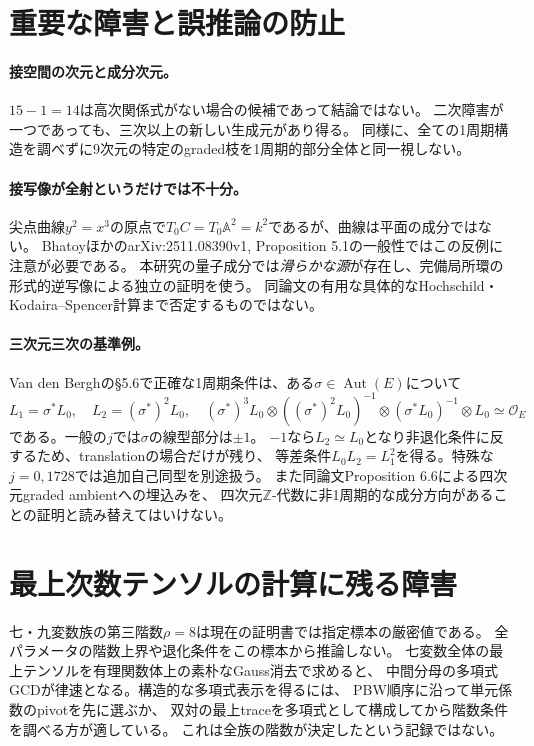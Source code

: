 \documentclass[11pt,a4paper]{ltjsarticle}
\begin{document}
\section{重要な障害と誤推論の防止}
\paragraph{接空間の次元と成分次元。}
$15-1=14$は高次関係式がない場合の候補であって結論ではない。
二次障害が一つであっても、三次以上の新しい生成元があり得る。
同様に、全ての1周期構造を調べずに9次元の特定のgraded枝を1周期的部分全体と同一視しない。

\paragraph{接写像が全射というだけでは不十分。}
尖点曲線$y^2=x^3$の原点で$T_0C=T_0\mathbb A^2=k^2$であるが、曲線は平面の成分ではない。
BhatoyほかのarXiv:2511.08390v1, Proposition 5.1の一般性ではこの反例に注意が必要である。
本研究の量子成分では\emph{滑らかな源}が存在し、完備局所環の形式的逆写像による独立の証明を使う。
同論文の有用な具体的なHochschild・Kodaira--Spencer計算まで否定するものではない。

\paragraph{三次元三次の基準例。}
Van den Berghの\S5.6で正確な1周期条件は、ある$\sigma\in\operatorname{Aut}(E)$について
\[
 L_1=\sigma^*L_0,\quad L_2=(\sigma^*)^2L_0,\quad
 (\sigma^*)^3L_0\otimes((\sigma^*)^2L_0)^{-1}\otimes(\sigma^*L_0)^{-1}\otimes L_0\simeq\mathcal O_E
\]
である。一般の$j$では$\sigma$の線型部分は$\pm1$。
$-1$なら$L_2\simeq L_0$となり非退化条件に反するため、translationの場合だけが残り、
等差条件$L_0L_2=L_1^2$を得る。特殊な$j=0,1728$では追加自己同型を別途扱う。
また同論文Proposition 6.6による四次元graded ambientへの埋込みを、
四次元$\mathbb Z$-代数に非1周期的な成分方向があることの証明と読み替えてはいけない。

\section{最上次数テンソルの計算に残る障害}
七・九変数族の第三階数$\rho=8$は現在の証明書では指定標本の厳密値である。
全パラメータの階数上界や退化条件をこの標本から推論しない。
七変数全体の最上テンソルを有理関数体上の素朴なGauss消去で求めると、
中間分母の多項式GCDが律速となる。構造的な多項式表示を得るには、
PBW順序に沿って単元係数のpivotを先に選ぶか、
双対の最上traceを多項式として構成してから階数条件を調べる方が適している。
これは全族の階数が決定したという記録ではない。
\end{document}
